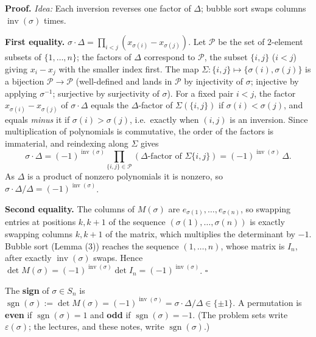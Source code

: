 \documentclass[11pt]{report}
\newcommand{\sgn}{\operatorname{sgn}}
\renewenvironment{proof}[1][Proof]{\noindent\textbf{#1.} }{\hfill$\square$\par\vspace{5pt}}
\begin{document}
\begin{proof}
\textit{Idea:} Each inversion reverses one factor of $\Delta$; bubble sort swaps columns $\operatorname{inv}(\sigma)$ times.\par
\textbf{First equality.} $\sigma \cdot \Delta = \prod_{i<j}(x_{\sigma(i)} - x_{\sigma(j)})$. Let $\mathcal{P}$ be the set of $2$-element subsets of $\{1, \ldots, n\}$; the factors of $\Delta$ correspond to $\mathcal{P}$, the subset $\{i, j\}$ ($i < j$) giving $x_i - x_j$ with the smaller index first. The map $\Sigma: \{i, j\} \mapsto \{\sigma(i), \sigma(j)\}$ is a bijection $\mathcal{P} \to \mathcal{P}$ (well-defined and lands in $\mathcal{P}$ by injectivity of $\sigma$; injective by applying $\sigma^{-1}$; surjective by surjectivity of $\sigma$). For a fixed pair $i < j$, the factor $x_{\sigma(i)} - x_{\sigma(j)}$ of $\sigma\cdot\Delta$ equals the $\Delta$-factor of $\Sigma(\{i,j\})$ if $\sigma(i) < \sigma(j)$, and equals \emph{minus} it if $\sigma(i) > \sigma(j)$, i.e.\ exactly when $(i, j)$ is an inversion. Since multiplication of polynomials is commutative, the order of the factors is immaterial, and reindexing along $\Sigma$ gives
\[ \sigma \cdot \Delta = (-1)^{\operatorname{inv}(\sigma)} \prod_{\{i,j\} \in \mathcal{P}} (\Delta\text{-factor of } \Sigma\{i,j\}) = (-1)^{\operatorname{inv}(\sigma)}\, \Delta. \]
As $\Delta$ is a product of nonzero polynomials it is nonzero, so $\sigma\cdot\Delta/\Delta = (-1)^{\operatorname{inv}(\sigma)}$.

\textbf{Second equality.} The columns of $M(\sigma)$ are $e_{\sigma(1)}, \ldots, e_{\sigma(n)}$, so swapping entries at positions $k, k+1$ of the sequence $(\sigma(1), \ldots, \sigma(n))$ is exactly swapping columns $k, k+1$ of the matrix, which multiplies the determinant by $-1$. Bubble sort (Lemma (3)) reaches the sequence $(1, \ldots, n)$, whose matrix is $I_n$, after exactly $\operatorname{inv}(\sigma)$ swaps. Hence $\det M(\sigma) = (-1)^{\operatorname{inv}(\sigma)} \det I_n = (-1)^{\operatorname{inv}(\sigma)}$.
\end{proof}

\begin{defbox}\label{def:sign-even-odd-permutations}
The \textbf{sign} of $\sigma \in S_n$ is $\sgn(\sigma) := \det M(\sigma) = (-1)^{\operatorname{inv}(\sigma)} = \sigma\cdot\Delta/\Delta \in \{\pm 1\}$. A permutation is \textbf{even} if $\sgn(\sigma) = 1$ and \textbf{odd} if $\sgn(\sigma) = -1$. (The problem sets write $\varepsilon(\sigma)$; the lectures, and these notes, write $\sgn(\sigma)$.)
\end{defbox}
\end{document}

